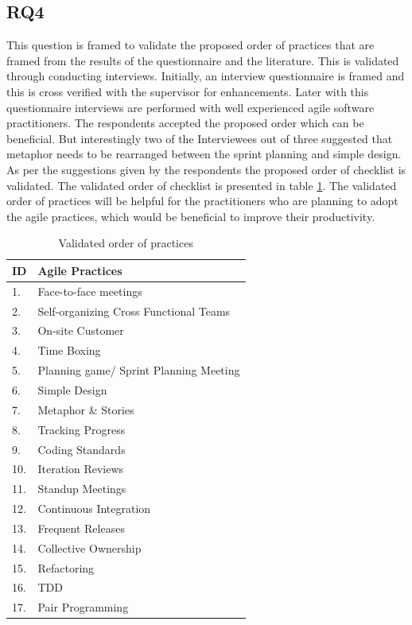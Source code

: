 \documentclass[a4paper,oneside]{bth}
\begin{document}
\subsection{RQ4}
This question is framed to validate the proposed order of practices that are framed from the results of the questionnaire and the literature. This is validated through conducting interviews. Initially, an interview questionnaire is framed and this is cross verified with the supervisor for enhancements. Later with this questionnaire interviews are performed with well experienced agile software practitioners. The respondents accepted the proposed order which can be beneficial. But interestingly two of the Interviewees out of three suggested that metaphor needs to be rearranged between the sprint planning and simple design. As per the suggestions given by the respondents the proposed order of checklist is validated. The validated order of checklist is presented in table \ref{validated}. The validated order of practices will be helpful for the practitioners who are planning to adopt the agile practices, which would be beneficial to improve their productivity.
\begin{table}[h]
\centering
\caption{Validated order of practices}
\label{validated}
\begin{tabular}{|l|l|}
\hline
\textbf{ID} & \textbf{Agile Practices} \\ \hline
1. & Face-to-face meetings \\ \hline
2. & Self-organizing Cross Functional Teams \\ \hline
3. & On-site Customer \\ \hline
4. & Time Boxing \\ \hline
5. & Planning game/ Sprint Planning Meeting \\ \hline
6. & Simple Design \\ \hline
7. & Metaphor \& Stories\\ \hline
8. & Tracking Progress \\ \hline
9. & Coding Standards \\ \hline
10. & Iteration Reviews \\ \hline
11. & Standup Meetings \\ \hline
12. & Continuous Integration \\ \hline
13. & Frequent Releases \\ \hline
14. & Collective Ownership \\ \hline
15. & Refactoring \\ \hline
16. & TDD \\ \hline
17. & Pair Programming \\ \hline
\end{tabular}
\end{table}
\end{document}
